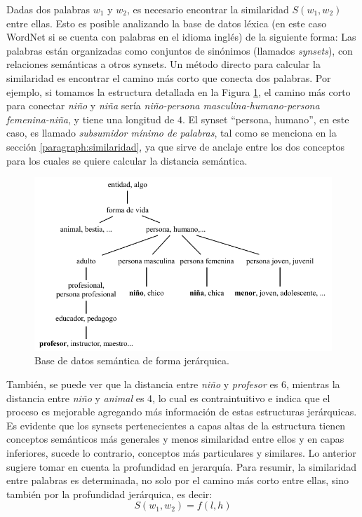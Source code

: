 \bigskip Dadas dos palabras \(w_1\) y \(w_2\), es necesario encontrar la similaridad \(S(w_1,w_2)\) entre ellas. Esto es posible analizando la base de datos léxica (en este caso WordNet si se cuenta con palabras en el idioma inglés) de la siguiente forma: Las palabras están organizadas como conjuntos de sinónimos (llamados \textit{synsets}), con relaciones semánticas a otros synsets. Un método directo para calcular la similaridad es encontrar el camino más corto que conecta dos palabras. Por ejemplo, si tomamos la estructura detallada en la Figura \ref{fig:taxonomiasemantica}, el camino más corto para conectar \textit{niño} y \textit{niña} sería \textit{niño-persona masculina-humano-persona femenina-niña}, y tiene una longitud de \(4\). El synset ``persona, humano'', en este caso, es llamado \textit{subsumidor mínimo de palabras}, tal como se menciona en la sección \ref{paragraph:similaridad}, ya que sirve de anclaje entre los dos conceptos para los cuales se quiere calcular la distancia semántica.

\begin{figure}[h!]
	\centering
	\includegraphics[width=0.9\linewidth]{7_marco_teorico/imagenes/taxonomia_semantica}
	\caption{Base de datos semántica de forma jerárquica.}
	\label{fig:taxonomiasemantica}
\end{figure}

También, se puede ver que la distancia entre \textit{niño} y \textit{profesor} es 6, mientras la distancia entre \textit{niño} y \textit{animal} es 4, lo cual es contraintuitivo e indica que el proceso es mejorable agregando más información de estas estructuras jerárquicas. Es evidente que los synsets pertenecientes a capas altas de la estructura tienen conceptos semánticos más generales y menos similaridad entre ellos y en capas inferiores, sucede lo contrario, conceptos más particulares y similares. Lo anterior sugiere tomar en cuenta la profundidad en jerarquía. Para resumir, la similaridad entre palabras es determinada, no solo por el camino más corto entre ellas, sino también por la profundidad jerárquica, es decir:
\[S(w_1,w_2)=f(l,h)\]

